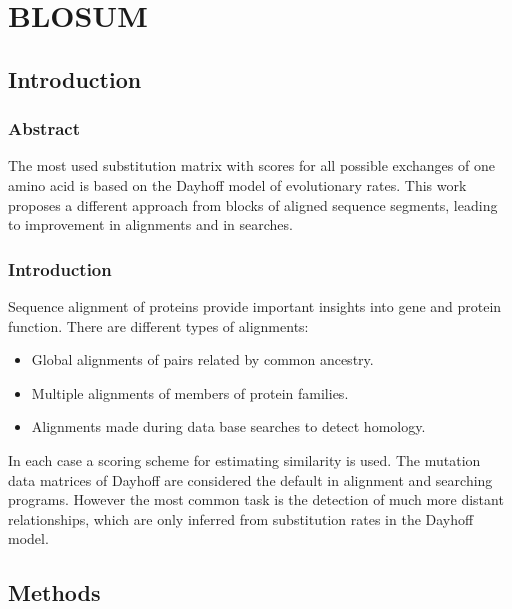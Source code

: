 \chapter{BLOSUM}

\section{Introduction}

	\subsection{Abstract}
	The most used substitution matrix with scores for all possible exchanges of one amino acid is based on the Dayhoff model of evolutionary rates.
	This work proposes a different approach from blocks of aligned sequence segments, leading to improvement in alignments and in searches.

	\subsection{Introduction}
	Sequence alignment of proteins provide important insights into gene and protein function.
	There are different types of alignments:

	\begin{multicols}{2}
		\begin{itemize}
			\item Global alignments of pairs related by common ancestry.
			\item Multiple alignments of members of protein families.
			\item Alignments made during data base searches to detect homology.
		\end{itemize}
	\end{multicols}

	In each case a scoring scheme for estimating similarity is used.
	The mutation data matrices of Dayhoff are considered the default in alignment and searching programs.
	However the most common task is the detection of much more distant relationships, which are only inferred from substitution rates in the Dayhoff model.

\section{Methods}

